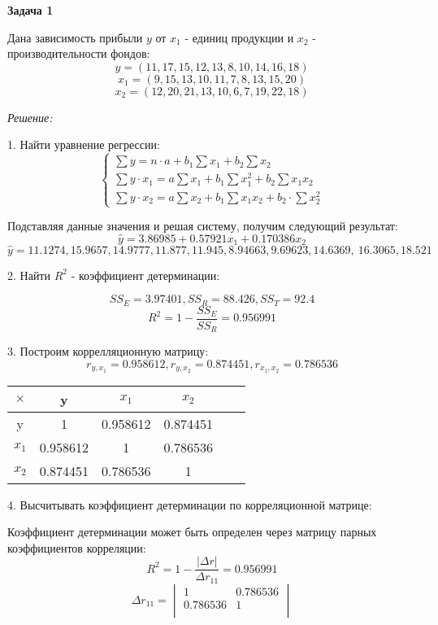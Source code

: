\documentclass[aps,%
12pt,%
final,%
oneside,
onecolumn,%
musixtex, %
superscriptaddress,%
centertags]{article} %
\begin{document}
\textbf{Задача 1}

Дана зависимость прибыли $y$ от $x_1$ - единиц продукции и $x_2$ - производительности фондов:
$$y = (11, 17, 15, 12, 13, 8, 10, 14, 16, 18)$$
$$x_1 =(9, 15, 13, 10, 11, 7, 8, 13, 15, 20)$$
$$x_2 = (12, 20, 21, 13, 10, 6, 7, 19, 22, 18)$$

\textit{Решение:}

1. Найти уравнение регрессии:
$$\left \{
\begin{matrix}
	\sum y = n \cdot a + b_1 \sum x_1 + b_2 \sum x_2 \\[0.3cm]
	\sum y \cdot x_1 = a \sum x_1 + b_1 \sum x_1^2 + b_2 \sum x_1x_2\\[0.3cm]
	\sum y \cdot x_2 = a\sum x_2 + b_1 \sum x_1x_2 + b_2 \cdot \sum x_2^2
\end{matrix}
\right.
$$

Подставляя данные значения и решая систему, получим следующий результат:
$$\widehat{y} = 3.86985 + 0.57921x_1 + 0.170386x_2$$
$$ \widehat{y}  = 11.1274, 15.9657, 14.9777, 11.877, 11.945, 8.94663, 9.69623, 14.6369, \
16.3065, 18.521$$

2. Найти $R^2$ - коэффициент детерминации:

$$ SS_E  =3.97401, SS_R = 88.426, SS_T =92.4 $$
$$ R^2 = 1- \frac{SS_E}{SS_R} = 0.956991$$

3. Построим коррелляционную матрицу:
$$r_{y,x_1} = 0.958612,r_{y,x_2} = 0.874451,r_{x_1,x_2} = 0.786536$$
\begin{table}[H]
	\begin{center}
		\begin{tabular}[t]{|c|c|c|c|c|c|} \hline
		$\times$ & y & $x_1$ & $x_2$ \\ \hline
		y & 1 & 0.958612 & 0.874451 \\ \hline
		$x_1$ & 0.958612 & 1 & 0.786536  \\ \hline
		$x_2$ & 0.874451 & 0.786536 & 1  \\ \hline
		\end{tabular}
	\end{center}
\end{table}

4. Высчитывать коэффициент детерминации по корреляционной матрице:

Коэффициент детерминации может быть определен через матрицу парных коэффициентов корреляции:
$$ R^2 = 1 -\frac{| \Delta r |}{\Delta r_{11}}  = 0.956991$$
$$ \Delta r_{11} = 
\begin{vmatrix}
	1 & 0.786536 \\
	0.786536 & 1 \\
\end{vmatrix}$$
\end{document}
